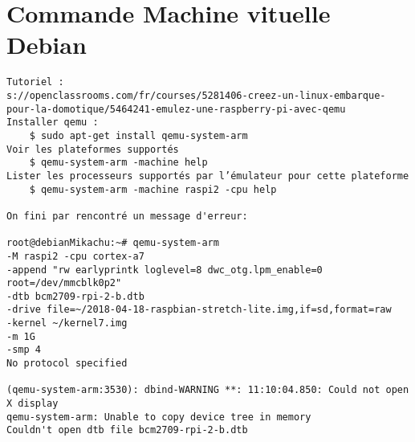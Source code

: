 \documentclass[a4paper]{report}
\begin{document}
    \section{Commande Machine vituelle Debian} \label{sec:qmu}

    \begin{verbatim}
Tutoriel : 
s://openclassrooms.com/fr/courses/5281406-creez-un-linux-embarque-pour-la-domotique/5464241-emulez-une-raspberry-pi-avec-qemu 
Installer qemu : 
    $ sudo apt-get install qemu-system-arm
Voir les plateformes supportés
    $ qemu-system-arm -machine help
Lister les processeurs supportés par l’émulateur pour cette plateforme
    $ qemu-system-arm -machine raspi2 -cpu help

On fini par rencontré un message d'erreur:

root@debianMikachu:~# qemu-system-arm 
-M raspi2 -cpu cortex-a7 
-append "rw earlyprintk loglevel=8 dwc_otg.lpm_enable=0 root=/dev/mmcblk0p2" 
-dtb bcm2709-rpi-2-b.dtb 
-drive file=~/2018-04-18-raspbian-stretch-lite.img,if=sd,format=raw 
-kernel ~/kernel7.img 
-m 1G 
-smp 4
No protocol specified

(qemu-system-arm:3530): dbind-WARNING **: 11:10:04.850: Could not open X display
qemu-system-arm: Unable to copy device tree in memory
Couldn't open dtb file bcm2709-rpi-2-b.dtb
    
    \end{verbatim}
\end{document}
